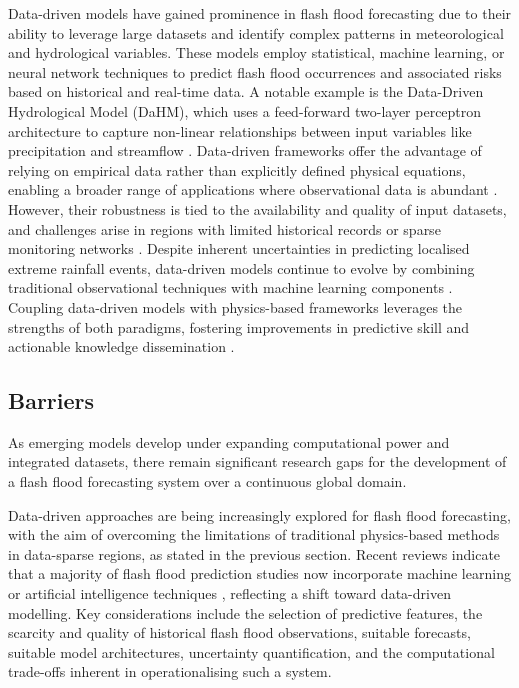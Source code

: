Data-driven models have gained prominence in flash flood forecasting due to their ability to leverage large datasets and identify complex patterns in meteorological and hydrological variables. These models employ statistical, machine learning, or neural network techniques to predict flash flood occurrences and associated risks based on historical and real-time data. A notable example is the Data-Driven Hydrological Model (DaHM), which uses a feed-forward two-layer perceptron architecture to capture non-linear relationships between input variables like precipitation and streamflow \citep{Philipp_2016}. Data-driven frameworks offer the advantage of relying on empirical data rather than explicitly defined physical equations, enabling a broader range of applications where observational data is abundant \citep{Zanchetta_2022, Msigwa_2024}. However, their robustness is tied to the availability and quality of input datasets, and challenges arise in regions with limited historical records or sparse monitoring networks \citep{Zanchetta_2020, Lu_2021}. Despite inherent uncertainties in predicting localised extreme rainfall events, data-driven models continue to evolve by combining traditional observational techniques with machine learning components \citep{AlRawas_2024}. Coupling data-driven models with physics-based frameworks leverages the strengths of both paradigms, fostering improvements in predictive skill and actionable knowledge dissemination \citep{Msigwa_2024}. 

\subsection{Barriers}

As emerging models develop under expanding computational power and integrated datasets, there remain significant research gaps for the development of a flash flood forecasting system over a continuous global domain. 

Data-driven approaches are being increasingly explored for flash flood forecasting, with the aim of overcoming the limitations of traditional physics-based methods in data-sparse regions, as stated in the previous section. Recent reviews indicate that a majority of flash flood prediction studies now incorporate machine learning or artificial intelligence techniques \citep{AlRawas_2024}, reflecting a shift toward data-driven modelling. Key considerations include the selection of predictive features, the scarcity and quality of historical flash flood observations, suitable forecasts, suitable model architectures, uncertainty quantification, and the computational trade-offs inherent in operationalising such a system.

